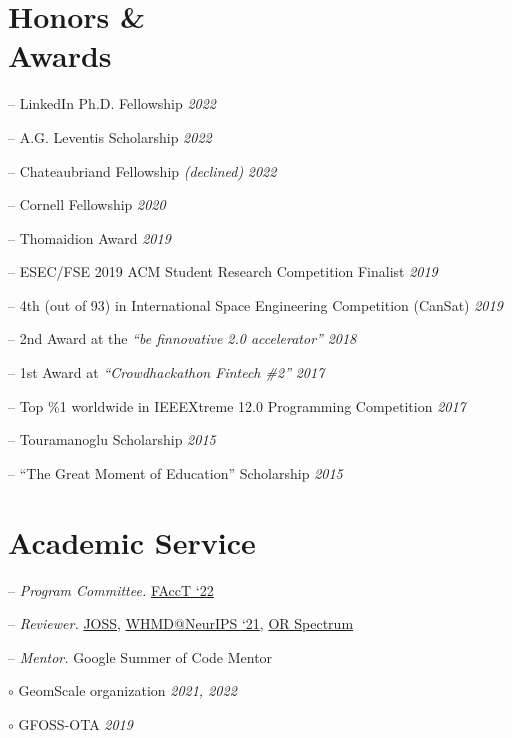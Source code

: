 \documentclass[margin]{res}
\begin{document}
\begin{resume}
\section{Honors \& \\ Awards} 
\begin{compactitem}
	\item[--] LinkedIn Ph.D. Fellowship \hfill \emph{2022} 	
	\item[--] A.G. Leventis Scholarship \hfill \emph{2022}
	\item[--] Chateaubriand Fellowship \emph{(declined)} \hfill \emph{2022}
	\item[--] Cornell Fellowship \hfill \emph{2020}
	\item[--] Thomaidion Award \hfill \emph{2019}
	\item[--] ESEC/FSE 2019 ACM Student Research Competition Finalist \hfill \emph{2019}

	\item[--] 4th (out of 93) in International Space Engineering  Competition (CanSat) \hfill \emph{2019}
    \item[--] 2nd Award at the \emph{``be finnovative 2.0 accelerator''} \hfill \emph{2018}
   	\item[--] 1st Award at \emph{``Crowdhackathon Fintech \#2''} \hfill \emph{2017}
   	\item[--] Top \%1 worldwide in IEEEXtreme 12.0 Programming Competition \hfill \emph{2017}
    \item [--] Touramanoglu Scholarship \hfill \emph{2015}
    \item [--] ``The Great Moment of Education'' Scholarship \hfill \emph{2015}

\end{compactitem}

\section{Academic Service} 
\begin{compactitem}

\item [--] \emph{Program Committee.} \href{https://facctconference.org/2022}{FAccT `22}
\item [--] \emph{Reviewer.} \href{https://joss.theoj.org/}{JOSS}, \href{https://sites.google.com/view/whmd2021}{WHMD@NeurIPS `21},  \href{https://www.springer.com/journal/291?gclid=Cj0KCQiAr5iQBhCsARIsAPcwROPwkZ2Nw4Ubg7i91Y2hITU4OE4lzk_56F09IS09b5wh-sMhuqgft0YaAgATEALw_wcB}{OR Spectrum}
\item [--] \emph{Mentor.} Google Summer of Code Mentor
\begin{compactitem}
	\item [$\circ$] GeomScale organization \hfill \emph{2021, 2022}
	\item [$\circ$] GFOSS-OTA \hfill \emph{2019}
 \end{compactitem}

\end{compactitem}

\end{resume}
\end{document}
